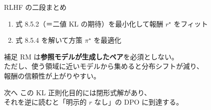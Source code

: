 \asmain
\begin{frame}{RLHF の二段まとめ}
    \begin{enumerate}
        \item 式 8.5.2（＝二値 KL の期待）を最小化して報酬 $r^\star$ をフィット
        \item 式 8.5.4 を解いて方策 $\pi^\star$ を最適化
    \end{enumerate}
    \begin{exampleblock}{補足}
        RM は\textbf{参照モデルが生成したペア}を必須としない。\\
        ただし、使う領域に近いモデルから集めると分布シフトが減り、\\
        報酬の信頼性が上がりやすい。
    \end{exampleblock}
    \begin{alertblock}{次へ}
        この KL 正則化目的には閉形式解があり、\\
        それを逆に読むと「明示的 $r$ なし」の DPO に到達する。
    \end{alertblock}
\end{frame}
